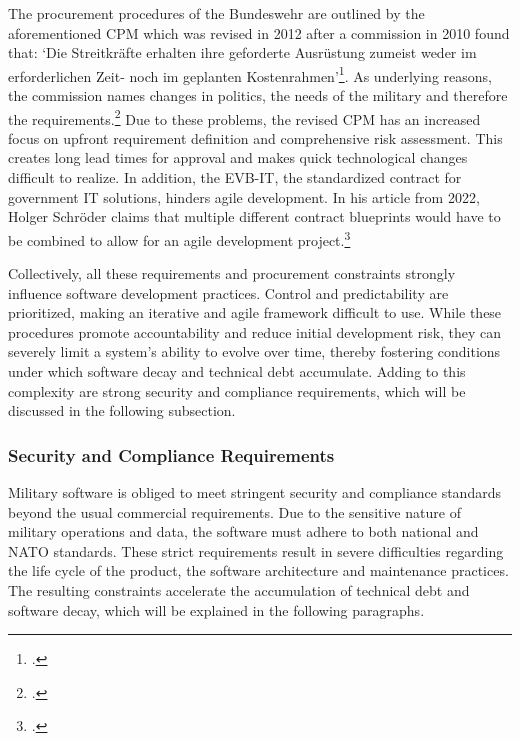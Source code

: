 The procurement procedures of the Bundeswehr are outlined by the aforementioned \ac{CPM} which was revised in 2012 after a commission in 2010 found that: 
`Die Streitkräfte erhalten ihre geforderte Ausrüstung zumeist weder im erforderlichen Zeit- noch im geplanten Kostenrahmen'\footcite[36]{strukturkommissionderbundeswehrBerichtStrukturkommissionBundeswehr2010}.
As underlying reasons, the commission names changes in politics, the needs of the military and therefore the requirements.\footcite[36]{strukturkommissionderbundeswehrBerichtStrukturkommissionBundeswehr2010}
Due to these problems, the revised \ac{CPM} has an increased focus on upfront requirement definition and comprehensive risk assessment. This creates long lead times
for approval and makes quick technological changes difficult to realize.
In addition, the \ac{EVB-IT}, the standardized contract for government IT solutions, hinders agile development. In his article from 2022,
Holger Schröder claims that multiple different contract blueprints would have to be combined to allow for an agile development project.\footcite[no page number]{schroederUngeeignetFuerAgile2022}

Collectively, all these requirements and procurement constraints strongly influence software development practices. Control and predictability are prioritized, making
an iterative and agile framework difficult to use. While these procedures promote accountability and reduce initial development risk, they can severely limit a system's ability to evolve over time, thereby fostering conditions under which software decay and technical debt accumulate. 
Adding to this complexity are strong security and compliance requirements, which will be discussed in the following subsection.

\subsubsection{Security and Compliance Requirements}
Military software is obliged to meet stringent security and compliance standards beyond the usual commercial requirements. Due to the sensitive nature of military operations and data,
the software must adhere to both national and NATO standards. These strict requirements result in severe difficulties 
regarding the life cycle of the product, the software architecture and maintenance practices. The resulting constraints accelerate the accumulation of technical debt and software decay, which will be explained in the following paragraphs.

